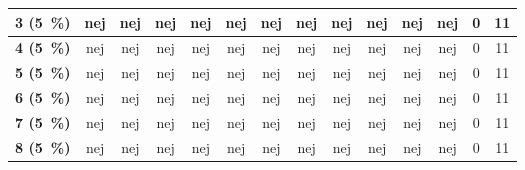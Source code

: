 \begin{longtable} {|l|c|c|c|c|c|c|c|c|c|c|c|c|c|}
\cellcolor[HTML]{C0C0C0}\textbf{3   (5~\%)}	 & \cellcolor[HTML]{34CDF9} nej	& \cellcolor[HTML]{34CDF9}nej &	\cellcolor[HTML]{34CDF9}nej &\cellcolor[HTML]{34CDF9} nej	& \cellcolor[HTML]{34CDF9}nej &	\cellcolor[HTML]{34CDF9}nej	& \cellcolor[HTML]{34CDF9}nej & \cellcolor[HTML]{34CDF9}nej	& \cellcolor[HTML]{34CDF9}nej	& \cellcolor[HTML]{34CDF9}nej	& \cellcolor[HTML]{34CDF9}nej & \cellcolor[HTML]{EFEFEF}0 & \cellcolor[HTML]{EFEFEF}11\\ \hline 
\cellcolor[HTML]{C0C0C0}\textbf{4    (5~\%)}	 & \cellcolor[HTML]{34CDF9} nej	& \cellcolor[HTML]{34CDF9}nej &	\cellcolor[HTML]{34CDF9}nej &\cellcolor[HTML]{34CDF9} nej	& \cellcolor[HTML]{34CDF9}nej &	\cellcolor[HTML]{34CDF9}nej	& \cellcolor[HTML]{34CDF9}nej & \cellcolor[HTML]{34CDF9}nej	& \cellcolor[HTML]{34CDF9}nej	& \cellcolor[HTML]{34CDF9}nej	& \cellcolor[HTML]{34CDF9}nej & \cellcolor[HTML]{EFEFEF}0 & \cellcolor[HTML]{EFEFEF}11\\ \hline 
\cellcolor[HTML]{C0C0C0}\textbf{5    (5~\%)}	 & \cellcolor[HTML]{34CDF9} nej	& \cellcolor[HTML]{34CDF9}nej &	\cellcolor[HTML]{34CDF9}nej &\cellcolor[HTML]{34CDF9} nej	& \cellcolor[HTML]{34CDF9}nej &	\cellcolor[HTML]{34CDF9}nej	& \cellcolor[HTML]{34CDF9}nej & \cellcolor[HTML]{34CDF9}nej	& \cellcolor[HTML]{34CDF9}nej	& \cellcolor[HTML]{34CDF9}nej	& \cellcolor[HTML]{34CDF9}nej & \cellcolor[HTML]{EFEFEF}0 & \cellcolor[HTML]{EFEFEF}11\\ \hline 
\cellcolor[HTML]{C0C0C0}\textbf{6    (5~\%)}	 & \cellcolor[HTML]{34CDF9} nej	& \cellcolor[HTML]{34CDF9}nej &	\cellcolor[HTML]{34CDF9}nej &\cellcolor[HTML]{34CDF9} nej	& \cellcolor[HTML]{34CDF9}nej &	\cellcolor[HTML]{34CDF9}nej	& \cellcolor[HTML]{34CDF9}nej & \cellcolor[HTML]{34CDF9}nej	& \cellcolor[HTML]{34CDF9}nej	& \cellcolor[HTML]{34CDF9}nej	& \cellcolor[HTML]{34CDF9}nej & \cellcolor[HTML]{EFEFEF}0 & \cellcolor[HTML]{EFEFEF}11\\ \hline 
\cellcolor[HTML]{C0C0C0}\textbf{7    (5~\%)}	 & \cellcolor[HTML]{34CDF9} nej	& \cellcolor[HTML]{34CDF9}nej &	\cellcolor[HTML]{34CDF9}nej &\cellcolor[HTML]{34CDF9} nej	& \cellcolor[HTML]{34CDF9}nej &	\cellcolor[HTML]{34CDF9}nej	& \cellcolor[HTML]{34CDF9}nej & \cellcolor[HTML]{34CDF9}nej	& \cellcolor[HTML]{34CDF9}nej	& \cellcolor[HTML]{34CDF9}nej	& \cellcolor[HTML]{34CDF9}nej & \cellcolor[HTML]{EFEFEF}0 & \cellcolor[HTML]{EFEFEF}11\\ \hline 
\cellcolor[HTML]{C0C0C0}\textbf{8    (5~\%)}	& \cellcolor[HTML]{34CDF9} nej	& \cellcolor[HTML]{34CDF9}nej &	\cellcolor[HTML]{34CDF9}nej &\cellcolor[HTML]{34CDF9} nej	& \cellcolor[HTML]{34CDF9}nej &	\cellcolor[HTML]{34CDF9}nej	& \cellcolor[HTML]{34CDF9}nej & \cellcolor[HTML]{34CDF9}nej	& \cellcolor[HTML]{34CDF9}nej	& \cellcolor[HTML]{34CDF9}nej	& \cellcolor[HTML]{34CDF9}nej & \cellcolor[HTML]{EFEFEF}0 & \cellcolor[HTML]{EFEFEF}11\\ \hline 

\end{longtable}
